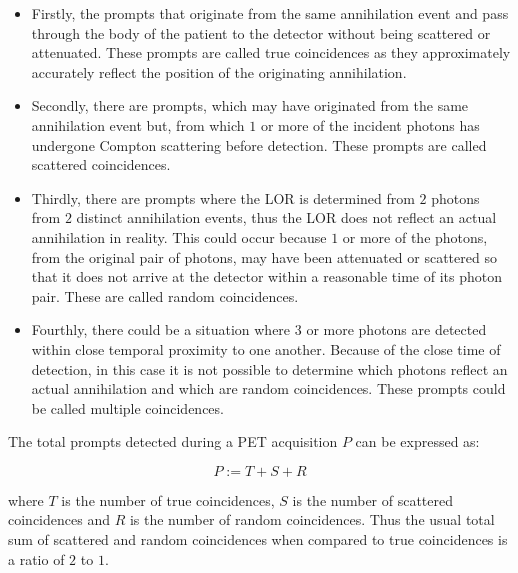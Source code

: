             \begin{itemize}
                \item Firstly, the prompts that originate from the same annihilation event and pass through the body of the patient to the detector without being scattered or attenuated. These prompts are called true coincidences as they approximately accurately reflect the position of the originating annihilation.
                
                \item Secondly, there are prompts, which may have originated from the same annihilation event but, from which $1$ or more of the incident photons has undergone Compton scattering before detection. These prompts are called scattered coincidences.
                
                \item Thirdly, there are prompts where the \gls{LOR} is determined from $2$ photons from $2$ distinct annihilation events, thus the \gls{LOR} does not reflect an actual annihilation in reality. This could occur because $1$ or more of the photons, from the original pair of photons, may have been attenuated or scattered so that it does not arrive at the detector within a reasonable time of its photon pair. These are called random coincidences.
                
                \item Fourthly, there could be a situation where $3$ or more photons are detected within close temporal proximity to one another. Because of the close time of detection, in this case it is not possible to determine which photons reflect an actual annihilation and which are random coincidences. These prompts could be called multiple coincidences.
            \end{itemize}
            
            The total prompts detected during a \gls{PET} acquisition $P$ can be expressed as:
            
            \begin{equation}
                P := T + S + R
            \end{equation}
            
            \noindent where $T$ is the number of true coincidences, $S$ is the number of scattered coincidences and $R$ is the number of random coincidences. Thus the usual total sum of scattered and random coincidences when compared to true coincidences is a ratio of $2$ to $1$.
            
